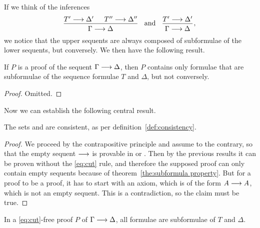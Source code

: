 \documentclass[11pt,a4paper]{article}
\begin{document}
If we think of the inferences
\begin{equation*}
    \begin{prooftree}
        \hypo{T'\seq\Delta'}
        \hypo{T''\seq\Delta''}
        \infer2{\Gamma\seq\Delta}
    \end{prooftree}
    \quad\text{and}\quad
    \begin{prooftree}
        \hypo{T'\seq\Delta'}
        \infer1{\Gamma\seq\Delta}
    \end{prooftree}\,,
\end{equation*}
we notice that the upper sequents are always composed of subformulae
of the lower sequents, but conversely. We then have the following result.

\begin{theorem}\label{the:subformula property}
    If \(P\) is a proof of the sequent \(\Gamma\longrightarrow\Delta\),
    then \(P\) contains only formulae that are subformulae of
    the sequence formulae \(T\) and \(\Delta\), but not conversely.
\end{theorem}

\begin{proof}
    Omitted.
\end{proof}

Now we can establish the following central result.

\begin{theorem}\label{eq:consistency of LK and LJ}
    The sets \LK{} and \LJ{} are consistent,
    as per definition~\ref{def:consistency}.
\end{theorem}

\begin{proof}
    We proceed by the contrapositive principle and
    assume to the contrary, so that the empty sequent \(\longrightarrow\)
    is provable in \LK{} or \LJ{}. Then by the previous results
    it can be proven without the \eqref{eq:cut} rule,
    and therefore the supposed proof can only contain empty sequents
    because of theorem~\ref{the:subformula property}.
    But for a proof to be a proof, it has to start with an
    axiom, which is of the form \(A\longrightarrow A\),
    which is not an empty sequent. This is a contradiction,
    so the claim must be true.
\end{proof}

\begin{theorem}\label{the:6.3}
    In a \eqref{eq:cut}-free proof \(P\) of \(\Gamma\longrightarrow\Delta\),
    all formulae are subformulae of \(T\) and \(\Delta\).
\end{theorem}
\end{document}
